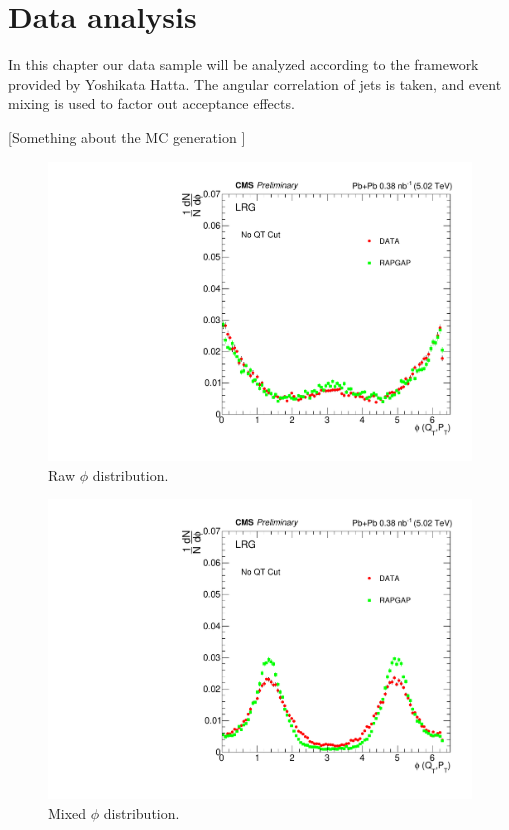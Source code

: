 
\chapter{Data analysis}

In this chapter our data sample will be analyzed according to the framework provided by Yoshikata Hatta. The angular correlation of jets is taken, and event mixing is used to factor out acceptance effects. 

[Something about the MC generation \cite{lheFormat}]


\begin{figure}[h!]
\begin{centering}
\includegraphics[width=6in]{Chapter6/importfigs/phi_allQt_raw.pdf}
\par\end{centering}
\caption{Raw $\phi$ distribution. \label{fig:rawPhi}}
\end{figure}

\begin{figure}[h!]
\begin{centering}
\includegraphics[width=6in]{Chapter6/importfigs/phi_allQt_mixed.pdf}
\par\end{centering}
\caption{Mixed $\phi$ distribution. \label{fig:mixPhi}}
\end{figure}

